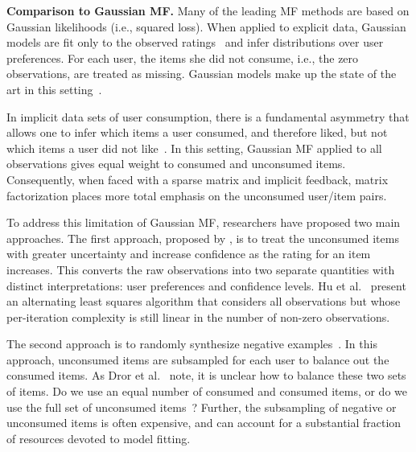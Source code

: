 {\bf Comparison to Gaussian MF.} Many of the leading MF methods are
based on Gaussian likelihoods (i.e., squared loss). When applied to
explicit data, Gaussian models are fit only to the observed
ratings~\cite{Koren:2009} and infer distributions over user
preferences. For each user, the items she did not consume, i.e., the
zero observations, are treated as missing. Gaussian models make up the
state of the art in this setting~\cite{Salakhutdinov:2008,
  Salakhutdinov:2008a,Koren:2009}.

In implicit data sets of user consumption, there is a fundamental
asymmetry that allows one to infer which items a user consumed, and
therefore liked, but not which items a user did not
like~\cite{Hu:2008p9402}. In this setting, Gaussian MF applied to all
observations gives equal weight to consumed and unconsumed items.
Consequently, when faced with a sparse matrix and implicit feedback,
matrix factorization places more total emphasis on the unconsumed
user/item pairs.

To address this limitation of Gaussian MF, researchers have proposed
two main approaches. The first approach, proposed by
\cite{Hu:2008p9402}, is to treat the unconsumed items with greater
uncertainty and increase confidence as the rating for an item
increases. This converts the raw observations into two separate
quantities with distinct interpretations: user preferences and
confidence levels. Hu et al.~\cite{Hu:2008p9402} present an
alternating least squares algorithm that considers all observations
but whose per-iteration complexity is still linear in the number of
non-zero observations.


The second approach is to randomly synthesize negative
examples~\cite{Dror:2012a, Gantner:2012p9364, Paquet:2013p9197}. In
this approach, unconsumed items are subsampled for each user to
balance out the consumed items. As Dror et al.~\cite{Dror:2012a} note,
it is unclear how to balance these two sets of items. Do we use an
equal number of consumed and consumed items, or do we use the full set
of unconsumed items~\cite{Cremonesi:2010, Hu:2008p9402}?  Further, the
subsampling of negative or unconsumed items is often expensive, and
can account for a substantial fraction of resources devoted to model
fitting.

